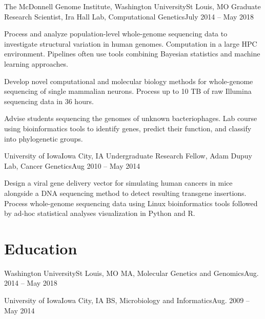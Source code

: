 \resumeItemListEnd


\resumeSubheading
{The McDonnell Genome Institute, Washington University}{St Louis, MO}
{Graduate Research Scientist, Ira Hall Lab, Computational Genetics}{July 2014 -- May 2018}

\resumeItemListStart

{Process and analyze population-level whole-genome sequencing data to investigate structural variation in human genomes. Computation in a large HPC environment. Pipelines often use tools combining Bayesian statistics and machine learning approaches.}

{Develop novel computational and molecular biology methods for whole-genome sequencing of single mammalian neurons. Process up to 10 TB of raw Illumina sequencing data in 36 hours.}

{Advise students sequencing the genomes of unknown bacteriophages. Lab course using bioinformatics tools to identify genes, predict their function, and classify into phylogenetic groups.}

\resumeItemListEnd


\resumeSubheading
{University of Iowa}{Iowa City, IA}
{Undergraduate Research Fellow, Adam Dupuy Lab, Cancer Genetics}{Aug 2010 -- May 2014}

\resumeItemListStart

{Design a viral gene delivery vector for simulating human cancers in mice alongside a DNA sequencing method to detect resulting transgene insertions. Process whole-genome sequencing data using Linux bioinformatics tools followed by ad-hoc statistical analyses visualization in Python and R.}

\resumeItemListEnd

\resumeSubHeadingListEnd

\section{Education}
\resumeSubHeadingListStart

\resumeSubheading
{Washington University}{St Louis, MO}
{MA, Molecular Genetics and Genomics}{Aug. 2014 -- May 2018}

\resumeSubheading
{University of Iowa}{Iowa City, IA}
{BS, Microbiology and Informatics}{Aug. 2009 -- May 2014}

